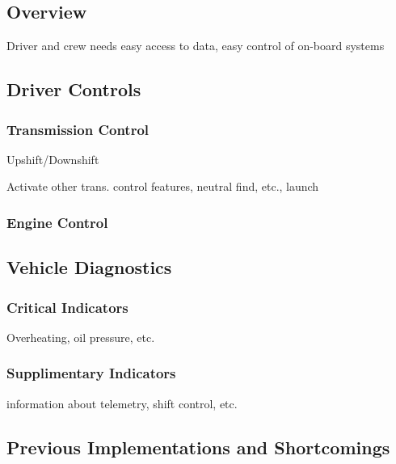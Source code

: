 \subsection{Overview}

Driver and crew needs easy access to data, easy control of on-board
systems


\subsection{Driver Controls}


\subsubsection{Transmission Control}

Upshift/Downshift

Activate other trans. control features, neutral find, etc., launch


\subsubsection{Engine Control}


\subsection{Vehicle Diagnostics}


\subsubsection{Critical Indicators}

Overheating, oil pressure, etc.


\subsubsection{Supplimentary Indicators}

information about telemetry, shift control, etc.


\subsection{Previous Implementations and Shortcomings}